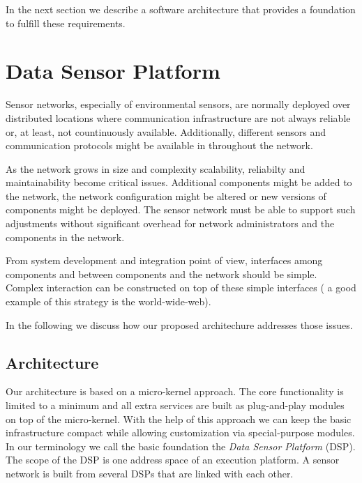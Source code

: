 \documentclass[conference]{IEEEtran}
\begin{document}
In the next section we describe a software architecture that provides
a foundation to fulfill these requirements.


\section{Data Sensor Platform}
\label{SEC_DSP}

Sensor networks, especially of environmental sensors, are normally deployed
over distributed locations where communication infrastructure are not always 
reliable or, at least, not countinuously available. Additionally, different
sensors and communication protocols might be available in throughout the network.

As the network grows in size and complexity scalability, reliabilty and maintainability
become critical issues. Additional components 
might be added to the network, the network configuration might be altered or 
new versions of components might be deployed. The sensor network must be able to 
support such adjustments without significant overhead for network administrators and
the components in the network.

From system development and integration point of view, interfaces among components and
between components and the network should be simple. Complex interaction can be 
constructed on top of these simple interfaces ( a good example of this strategy is the 
world-wide-web). 

In the following we discuss how our proposed architechure addresses those issues.

\subsection{Architecture}

Our architecture is based on a micro-kernel approach. The core
functionality is limited to a minimum and all extra services are built
as plug-and-play modules on top of the micro-kernel. With the help of
this approach we can keep the basic infrastructure compact while
allowing customization via special-purpose modules. In our terminology
we call the basic foundation the \emph{Data Sensor Platform}
(DSP). The scope of the DSP is one address space of an execution
platform. A sensor network is built from several DSPs that are linked
with each other.
\end{document}
